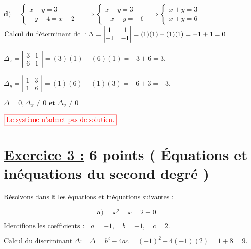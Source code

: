 \documentclass[12pt,a4paper]{article}
\begin{document}
\(\textbf{d)} \quad
\begin{aligned}
\begin{cases}
x + y = 3 \\
-y + 4 = x - 2
\end{cases}&\implies
\begin{cases}
x + y = 3 \\
-x-y  = - 6
\end{cases}\implies
\begin{cases}
x + y = 3 \\
x+y  =  6
\end{cases}
\end{aligned}
\)\\

\(
\text{Calcul du déterminant de }: \\
\Delta = \left| \begin{matrix} 1 & 1 \\ -1 & -1 \end{matrix} \right| = (1)(1) - (1)(1) = -1 + 1 = 0.
\)

\(
\Delta_{x} = \left| \begin{matrix} 3 & 1 \\ 6 & 1 \end{matrix} \right| = (3)(1) - (6)(1) = -3 + 6 = 3.
\)

\(
\Delta_{y} = \left| \begin{matrix} 1 & 3 \\ 1 & 6 \end{matrix} \right| = (1)(6) - (1)(3) = -6 + 3 = -3.
\)

\(
\Delta=0, \Delta_{x}\neq 0 \textbf{ et } \Delta_{y}\neq 0
\)

\(
\textcolor{red}{\boxed{\text{Le système n'admet pas de solution.}}}
\)

\section*{\underline{Exercice 3 :} 6 points ( Équations et inéquations du second degré )}

Résolvons dans \(\mathbb{R}\) les équations et inéquations suivantes :

\[ \textbf{a)} \, -x^2 - x + 2 = 0 \]

\(
\text{Identifions les coefficients :} \quad a = -1, \quad b = -1, \quad c = 2.
\)

\(
\text{Calcul du discriminant } \Delta : \quad
\Delta = b^2 - 4ac = (-1)^2 - 4(-1)(2) = 1 + 8 = 9.
\)
\end{document}
